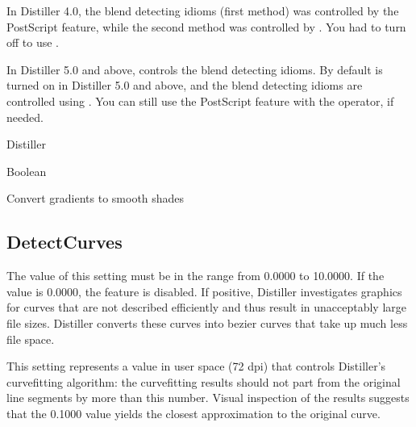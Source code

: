 \documentclass[letterpaper,12pt,english,openany,oneside]{sphinxmanual}
\begin{document}
In Distiller 4.0, the blend detecting idioms (first method) was controlled by the  PostScript feature, while the second method was controlled by  . You had to turn off  to use  .

In Distiller 5.0 and above,  controls the blend detecting idioms. By default  is turned on in Distiller 5.0 and above, and the blend detecting idioms are controlled using  . You can still use the PostScript feature  with the  operator, if needed.

\label{\detokenize{PDF_Create_CommonSettings:supported-by-92}}

Distiller

\label{\detokenize{PDF_Create_CommonSettings:type-91}}

Boolean

\label{\detokenize{PDF_Create_CommonSettings:ui-name-75}}

Convert gradients to smooth shades

\label{\detokenize{PDF_Create_CommonSettings:default-value-86}}

\begin{sphinxVerbatim}[commandchars=\\\{\}]
\end{sphinxVerbatim}


\subsection{DetectCurves}
\label{\detokenize{PDF_Create_CommonSettings:detectcurves}}
The value of this setting must be in the range from 0.0000 to 10.0000. If the value is 0.0000, the feature is disabled. If positive, Distiller investigates graphics for curves that are not described efficiently and thus result in unacceptably large file sizes. Distiller converts these curves into bezier curves that take up much less file space.

This setting represents a value in user space (72 dpi) that controls Distiller’s curve\sphinxhyphen{}fitting algorithm: the curve\sphinxhyphen{}fitting results should not part from the original line segments by more than this number. Visual inspection of the results suggests that the 0.1000 value yields the closest approximation to the original curve.
\end{document}
